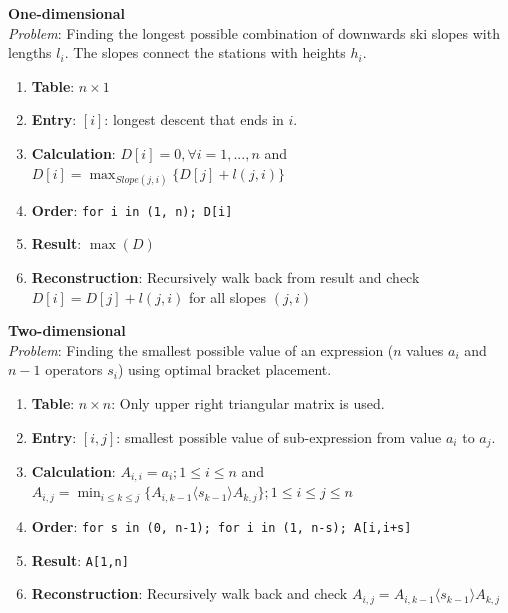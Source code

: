 \documentclass[9pt,landscape,a4paper, table]{extarticle}
\begin{document}
\begin{multicols*}{3}
\textbf{One-dimensional}\\
\textit{Problem}: Finding the longest possible combination of downwards ski slopes with lengths $l_i$. The slopes connect the stations with heights $h_i$.  
\begin{enumerate}
    \item \textbf{Table}: $n\times 1$ 
    \item \textbf{Entry}: $[i]$: longest descent that ends in $i$.
    \item \textbf{Calculation}: $D[i] = 0, \forall i = 1, ... ,n$ and $\displaystyle D[i] = \max_{Slope(j,i)}\{D[j] + l(j,i)\}$
    \item \textbf{Order}: \texttt{for i in (1, n); D[i]}
    \item \textbf{Result}: $\max(D)$
    \item \textbf{Reconstruction}: Recursively walk back from result and check $\displaystyle D[i] = D[j] + l(j,i)$ for all slopes $(j,i)$
\end{enumerate}

\textbf{Two-dimensional}\\
\textit{Problem}: Finding the smallest possible value of an expression ($n$ values $a_i$ and $n-1$ operators $s_i$) using optimal bracket placement. 
\begin{enumerate}
    \item \textbf{Table}: $n\times n$: Only upper right triangular matrix is used. 
    \item \textbf{Entry}: $[i,j]$: smallest possible value of sub-expression from value $a_i$ to $a_j$.
    \item \textbf{Calculation}: $A_{i,i} = a_i; 1\leq i \leq n$ and $\displaystyle A_{i,j} = \min_{i\leq k \leq j}\{A_{i,k-1}\langle s_{k-1}\rangle A_{k,j}\}; 1\leq i\leq j\leq n$
    \item \textbf{Order}: \texttt{for s in (0, n-1); for i in (1, n-s); A[i,i+s]}
    \item \textbf{Result}: \texttt{A[1,n]}
    \item \textbf{Reconstruction}: Recursively walk back and check $\displaystyle A_{i,j} = A_{i,k-1}\langle s_{k-1}\rangle A_{k,j}$
\end{enumerate}





\end{multicols*}
\end{document}
